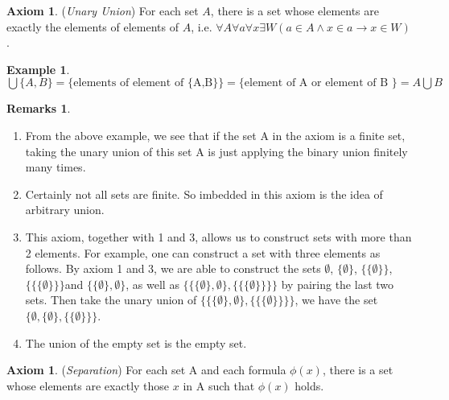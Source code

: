 \documentclass[14pt]{article}
\theoremstyle{definition}
\newtheorem*{remark}{Remarks}
\newtheorem*{example}{Example}
\newtheorem{axiom}[definition]{Axiom}
\begin{document}
\begin{axiom}
    (\textit{Unary Union}) For each set $A$, there is a set whose elements are exactly the elements of elements of $A$, i.e.  $\forall A\forall a\forall x\exists W(a\in A \land x\in a \rightarrow x\in W)$.
\end{axiom}

\begin{example}
    $\bigcup\{A,B\}=\big\{ \text{elements of element of \{A,B\} }\big\}=\big\{ \text{element of A or element of B }\big\}=A\bigcup B$
\end{example}

\begin{remark}
    \hfill
    \begin{enumerate}
        \item From the above example, we see that if the set A in the axiom is a finite set, taking the unary union of this set A is just applying the binary union finitely many times.
        \item Certainly not all sets are finite. So imbedded in this axiom is the idea of arbitrary union.
        \item This axiom, together with 1 and 3, allows us to construct sets with more than 2 elements. For example, one can construct a set with three elements as follows. By axiom 1 and 3, we are able to construct the sets $\emptyset$, $\{\emptyset\}$, $\big\{ \{\emptyset\}\big\}$, $\Big\{\big\{ \{\emptyset\}\big\}\Big\}$and $\big\{\{\emptyset\}, \emptyset\big\}$, as well as $\bigg\{\big\{\{\emptyset\}, \emptyset\big\}, \Big\{\big\{ \{\emptyset\}\big\}\Big\}\bigg\}$ by pairing the last two sets.  Then take the unary union of $\bigg\{\big\{\{\emptyset\}, \emptyset\big\}, \Big\{\big\{ \{\emptyset\}\big\}\Big\}\bigg\}$, we have the set $\Big\{\emptyset, \{\emptyset\},\big\{ \{\emptyset\}\big\}\Big\}$.
        \item The union of the empty set is the empty set.
    \end{enumerate}
\end{remark}

\vspace{3mm}

\begin{axiom}
    (\textit{Separation}) For each set A and each formula $\phi(x)$, there is a set whose elements are exactly those $x$ in A such that $\phi(x)$ holds. 
\end{axiom}
\end{document}
